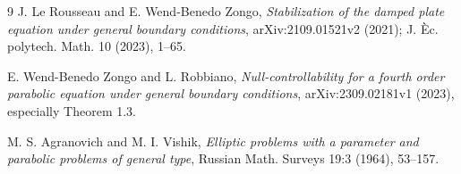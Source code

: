 \documentclass[11pt]{article}
\begin{document}
\begin{thebibliography}{9}
J. Le Rousseau and E. Wend-Benedo Zongo,
\emph{Stabilization of the damped plate equation under general boundary
conditions}, arXiv:2109.01521v2 (2021); J. \`Ec. polytech. Math. 10 (2023),
1--65.

E. Wend-Benedo Zongo and L. Robbiano,
\emph{Null-controllability for a fourth order parabolic equation under
general boundary conditions}, arXiv:2309.02181v1 (2023), especially Theorem
1.3.

M. S. Agranovich and M. I. Vishik,
\emph{Elliptic problems with a parameter and parabolic problems of general
type}, Russian Math. Surveys 19:3 (1964), 53--157.
\end{thebibliography}
\end{document}
